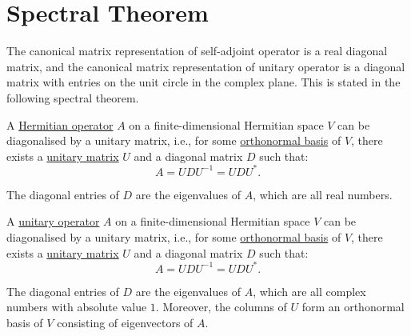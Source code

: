 \section{Spectral Theorem}\label{sec:spectral-theorem}

The canonical matrix representation of self-adjoint operator is a real diagonal matrix, and the canonical matrix representation of unitary operator is a diagonal matrix with entries on the unit circle in the complex plane. This is stated in the following spectral theorem.

\begin{theorem}\label{thm:spectral-theorem-hermitian-matrices}
	A \hyperref[def:hermitian_matrix]{Hermitian operator} $A$ on a finite-dimensional Hermitian space $V$ can be diagonalised by a unitary matrix, i.e., for some \hyperref[def:orthogonal_orthonormal_basis]{orthonormal basis} of $V$, there exists a \hyperref[def:unitary_matrix]{unitary matrix} $U$ and a diagonal matrix $D$ such that:
	\[
		A = U D U^{-1} = U D U^*.
	\]
\end{theorem}
The diagonal entries of $D$ are the eigenvalues of $A$, which are all real numbers.

\begin{theorem}\label{thm:spectral-theorem-unitary-matrices}
	A \hyperref[def:unitary_matrix]{unitary operator} $A$ on a finite-dimensional Hermitian space $V$ can be diagonalised by a unitary matrix, i.e., for some \hyperref[def:orthogonal_orthonormal_basis]{orthonormal basis} of $V$, there exists a \hyperref[def:unitary_matrix]{unitary matrix} $U$ and a diagonal matrix $D$ such that:
	\[
		A = U D U^{-1} = U D U^*.
	\]
\end{theorem}
The diagonal entries of $D$ are the eigenvalues of $A$, which are all complex numbers with absolute value $1$. Moreover, the columns of $U$ form an orthonormal basis of $V$ consisting of eigenvectors of $A$.

